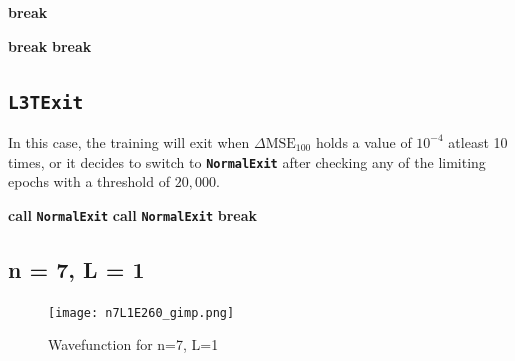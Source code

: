 \documentclass{article}
\newcommand{\dmse}{$\displaystyle{\Delta \text{MSE}_{100}}$ }
\newcommand{\oom}[1]{$10^{#1}$}
\newcommand{\lTTTExit}{\texttt{\textbf{L3TExit}} }
\newcommand{\normalExit}{\texttt{\textbf{NormalExit}} }
\begin{document}
\begin{algorithm}[H]
\caption{\normalExit}\label{alg:normalExit}
\begin{algorithmic}[1]
        \State \textbf{break}
    \EndIf
{}
\end{algorithmic}
\end{algorithm}

\begin{algorithm}[H]
\caption{\normalExit (Continued)}\label{alg:normalExit}
\begin{algorithmic}[1]
\EndIf
{}
    \State \textbf{break}
\EndIf
{}
    \State \textbf{break}
\EndIf
\end{algorithmic}
\end{algorithm}

\subsection{\texttt{L3TExit}}

\justify
In this case, the training will exit when \dmse holds a value of \oom{-4} atleast 10 times, or it decides to switch to \normalExit after checking any of the limiting epochs with a threshold of $20,000$.

\begin{algorithm}[H]
\caption{\lTTTExit}\label{alg:lTTTExit}
\begin{algorithmic}[1]
    \State \textbf{call} \normalExit
\EndIf
{}
        \State \textbf{call} \normalExit
        \State \textbf{break}
    \EndIf
\EndIf
\end{algorithmic}
\end{algorithm}

\subsection {n = 7, L = 1}

\begin{figure}[!htb]
    \centering
    \texttt{[image: n7L1E260\_gimp.png]}
    \label{fig:n7L1_diagGimp}
    \caption{Wavefunction for n=7, L=1}
\end{figure}
\end{document}
